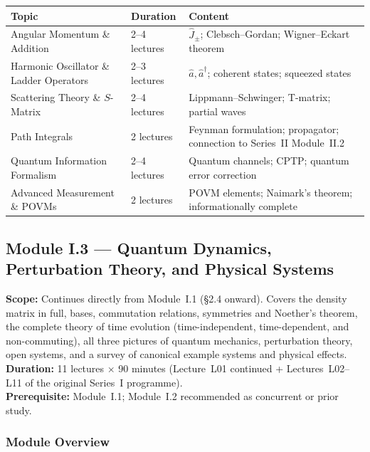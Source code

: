 \documentclass[11pt,a4paper]{article}
\newcommand{\coursebadge}[1]{%
  \begin{tcolorbox}[highlightbox]#1\end{tcolorbox}%
}
\begin{document}
\begin{center}
\begin{tabular}{lll}
\toprule
\textbf{Topic} & \textbf{Duration} & \textbf{Content}\\
\midrule
Angular Momentum \& Addition & 2--4 lectures & $\hat{J}_\pm$; Clebsch--Gordan; Wigner--Eckart theorem\\
Harmonic Oscillator \& Ladder Operators & 2--3 lectures & $\hat{a},\hat{a}^\dagger$; coherent states; squeezed states\\
Scattering Theory \& $S$-Matrix & 2--4 lectures & Lippmann--Schwinger; T-matrix; partial waves\\
Path Integrals & 2 lectures & Feynman formulation; propagator; connection to Series~II Module~II.2\\
Quantum Information Formalism & 2--4 lectures & Quantum channels; CPTP; quantum error correction\\
Advanced Measurement \& POVMs & 2 lectures & POVM elements; Naimark's theorem; informationally complete\\
\bottomrule
\end{tabular}
\end{center}

\newpage
\subsection{Module I.3 --- Quantum Dynamics, Perturbation Theory, and Physical Systems}
\label{sec:mod-I3}

\coursebadge{%
  \textbf{Scope:} Continues directly from Module~I.1 (\S2.4 onward). Covers the
  density matrix in full, bases, commutation relations, symmetries and Noether's
  theorem, the complete theory of time evolution (time-independent, time-dependent,
  and non-commuting), all three pictures of quantum mechanics, perturbation theory,
  open systems, and a survey of canonical example systems and physical effects.\\[2pt]
  \textbf{Duration:} 11 lectures $\times$ 90 minutes (Lecture~L01 continued + Lectures~L02--L11
  of the original Series~I programme).\\[2pt]
  \textbf{Prerequisite:} Module~I.1; Module~I.2 recommended as concurrent or prior study.
}

\subsubsection*{Module Overview}
\end{document}
